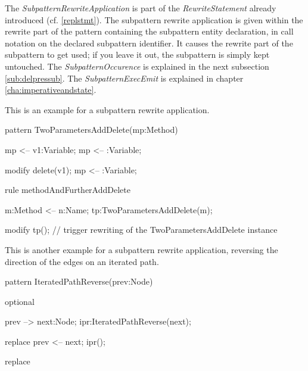 \noindent The \emph{SubpatternRewriteApplication} is part of the \emph{RewriteStatement} already introduced (cf. \ref{replstmt}).
The subpattern rewrite application is given within the rewrite part of the pattern containing the subpattern entity declaration,
in call notation on the declared subpattern identifier.
It causes the rewrite part of the subpattern to get used; if you leave it out, the subpattern is simply kept untouched.
The \emph{SubpatternOccurence} is explained in the next subsection \ref{sub:delpressub}.
The \emph{SubpatternExecEmit} is explained in chapter \ref{cha:imperativeandstate}.

\pagebreak

\begin{example}
This is an example for a subpattern rewrite application.

  \begin{grgen}
pattern TwoParametersAddDelete(mp:Method)
{
  mp <-- v1:Variable;
  mp <-- :Variable;

  modify {
    delete(v1);
    mp <-- :Variable;
  }
}
rule methodAndFurtherAddDelete
{
  m:Method <-- n:Name;
  tp:TwoParametersAddDelete(m);

  modify {
    tp(); // trigger rewriting of the TwoParametersAddDelete instance
  }
}
  \end{grgen}
\end{example}


\begin{example}
This is another example for a subpattern rewrite application,
reversing the direction of the edges on an iterated path.

  \begin{grgen}
pattern IteratedPathReverse(prev:Node)
{
  optional {
    prev --> next:Node;
    ipr:IteratedPathReverse(next);
    
    replace {
      prev <-- next;
      ipr();
    }
  }

  replace {
  }
}
  \end{grgen}
\end{example}

